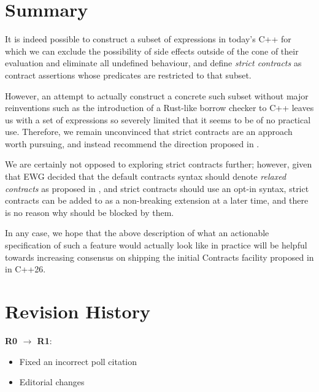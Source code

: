 \section{Summary}

It is indeed possible to construct a subset of expressions in today's C++ for which we can exclude the possibility of side effects outside of the cone of their evaluation and eliminate all undefined behaviour, and define \emph{strict contracts} as contract assertions whose predicates are restricted to that subset.

However, an attempt to actually construct a concrete such subset without major reinventions such as the introduction of a Rust-like borrow checker to C++ leaves us with a set of expressions so severely limited that it seems to be of no practical use. Therefore, we remain unconvinced that strict contracts are an approach worth pursuing, and instead recommend the direction proposed in \cite{P3100R1}.

We are certainly not opposed to exploring strict contracts further; however, given that EWG decided that the default contracts syntax  should denote \emph{relaxed contracts} as proposed in \cite{P2900R13}, and strict contracts should use an opt-in syntax, strict contracts can be added to \cite{P2900R13} as a non-breaking extension at a later time, and there is no reason why \cite{P2900R13} should be blocked by them.

In any case, we hope that the above description of what an actionable specification of such a feature would actually look like in practice will be helpful towards increasing consensus on shipping the initial Contracts facility proposed in \cite{P2900R13} in C++26.



\section*{Revision History}
\textbf{R0 $\rightarrow$ R1}: 
\begin{itemize}
\item Fixed an incorrect poll citation
\item Editorial changes
\end{itemize}


\renewcommand{\addcontentsline}[3]{}%







